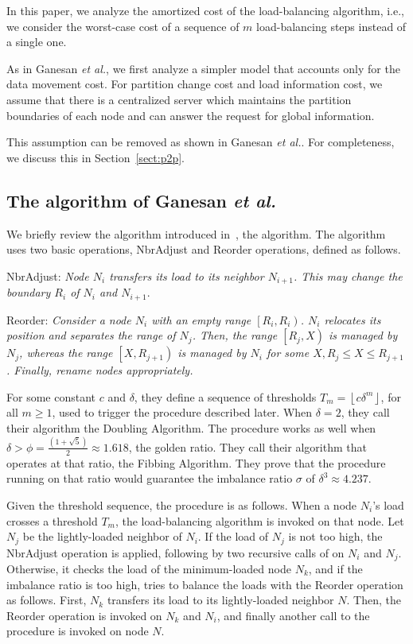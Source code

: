 \documentclass[a4paper]{article}
\begin{document}
In this paper, we analyze the amortized cost of the load-balancing
algorithm, i.e., we consider the worst-case cost of a sequence of $m$
load-balancing steps instead of a single one.

As in Ganesan {\em et al.}, we first analyze a simpler model that
accounts only for the data movement cost.  For partition change cost and load
information cost, we assume that there is a centralized server which
maintains the partition boundaries of each node and can answer the
request for global information. 

This assumption can be removed as shown in Ganesan {\em et al.}.  For
completeness, we discuss this in Section~\ref{sect:p2p}.

\subsection{The algorithm of Ganesan {\em et al.}}
\label{sect:GBGM}

We briefly review the algorithm introduced
in~\cite{GanesanBGM04-vldb}, the {\adjload} algorithm. The algorithm
uses two basic operations, {\sc NbrAdjust} and {\sc Reorder}
operations, defined as follows.

{\sc NbrAdjust}: \textit{Node $N_i$ transfers its load to its neighbor
  $N_{i+1}$. This may change the boundary $R_i$ of $N_i$ and
  $N_{i+1}$}.

{\sc Reorder}: \textit{ Consider a node $N_i$ with an empty range
  $\left[ R_i, R_i \right)$.  $N_i$ relocates its position and
  separates the range of $N_j$.  Then, the range $\left[ R_j, X
  \right)$ is managed by $N_j$, whereas the range $\left[ X, R_{j+1}
  \right)$ is managed by $N_i$ for some $X, R_j \leq X \leq
  R_{j+1}$. Finally, rename nodes appropriately.}

For some constant $c$ and $\delta$, they define a sequence of
thresholds $T_m=\left\lfloor c\delta^m \right\rfloor$, for all $m \geq
1$, used to trigger the {\adjload} procedure described later.  When
$\delta=2$, they call their algorithm the Doubling Algorithm.  
The {\adjload} procedure works as well when $\delta>\phi=\frac{(1+\sqrt{5})}{2}\approx 1.618$, the golden
ratio. They call their algorithm that operates at that ratio, the
Fibbing Algorithm. They prove that the {\adjload} procedure running on that ratio
would guarantee the imbalance ratio $\sigma$ of $\delta^3\approx 4.237$.

Given the threshold sequence, the {\adjload} procedure is as follows. When
a node $N_i$'s load crosses a threshold $T_m$, the load-balancing
algorithm is invoked on that node. Let $N_j$ be the lightly-loaded
neighbor of $N_i$. If the load of $N_j$ is not too high, the {\sc
  NbrAdjust} operation is applied, following by two recursive calls of 
{\adjload} on $N_i$ and $N_j$. Otherwise, it checks the load of the
minimum-loaded node $N_k$, and if the imbalance ratio is too high, tries to balance the
loads with the {\sc Reorder} operation as follows.
First, $N_k$ transfers its load to its lightly-loaded neighbor $N$.
Then, the {\sc Reorder} operation is invoked on $N_k$ and $N_i$, and
finally another call to the {\adjload} procedure is invoked on node $N$.
\end{document}
